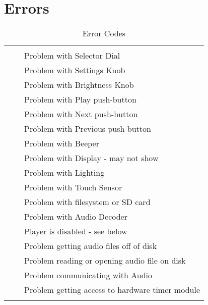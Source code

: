 \section{Errors} \label{Error Codes}
\begin{longtabu} { X[1,c,m] | X[1,c,m] | X[4,l,m] | }
  \thrule

   &  &  \\ \mrule

    & 
    & Problem with Selector Dial \\ \mrule

    & 
    & Problem with Settings Knob \\ \mrule

    & 
    & Problem with Brightness Knob \\ \mrule

    & 
    & Problem with Play push-button \\ \mrule

    & 
    & Problem with Next push-button \\ \mrule

    & 
    & Problem with Previous push-button \\ \mrule

    & 
    & Problem with Beeper \\ \mrule

    & 
    & Problem with Display - may not show \\ \mrule

    & 
    & Problem with Lighting \\ \mrule

    & 
    & Problem with Touch Sensor \\ \mrule

    & 
    & Problem with filesystem or SD card \\ \mrule

    & 
    & Problem with Audio Decoder \\ \mrule

    & 
    & Player is disabled - see below \\ \mrule

    & 
    & Problem getting audio files off of disk \\ \mrule

    & 
    & Problem reading or opening audio file on disk \\ \mrule

    & 
    & Problem communicating with Audio \\ \mrule

    & 
    & Problem getting access to hardware timer module \\

  \bhrule
\caption{Error Codes}
\end{longtabu}

